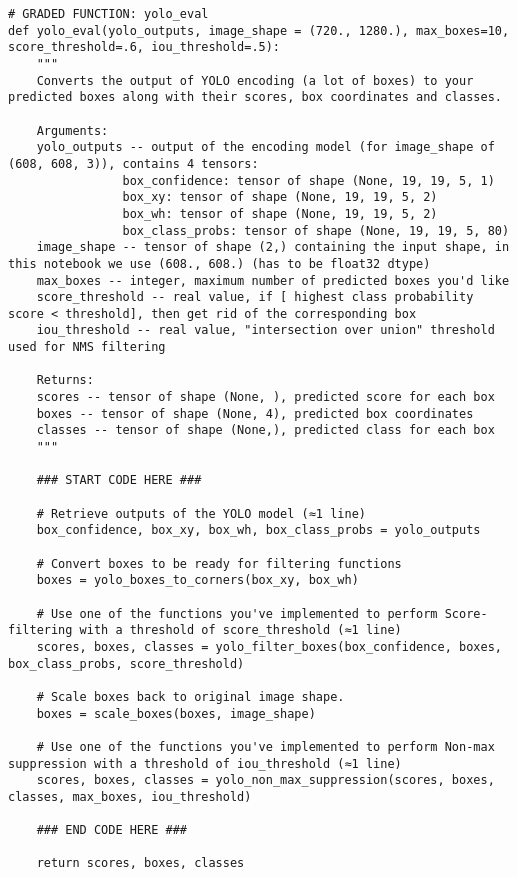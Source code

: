 \begin{verbatim}
# GRADED FUNCTION: yolo_eval
def yolo_eval(yolo_outputs, image_shape = (720., 1280.), max_boxes=10, score_threshold=.6, iou_threshold=.5):
    """
    Converts the output of YOLO encoding (a lot of boxes) to your predicted boxes along with their scores, box coordinates and classes.
    
    Arguments:
    yolo_outputs -- output of the encoding model (for image_shape of (608, 608, 3)), contains 4 tensors:
                box_confidence: tensor of shape (None, 19, 19, 5, 1)
                box_xy: tensor of shape (None, 19, 19, 5, 2)
                box_wh: tensor of shape (None, 19, 19, 5, 2)
                box_class_probs: tensor of shape (None, 19, 19, 5, 80)
    image_shape -- tensor of shape (2,) containing the input shape, in this notebook we use (608., 608.) (has to be float32 dtype)
    max_boxes -- integer, maximum number of predicted boxes you'd like
    score_threshold -- real value, if [ highest class probability score < threshold], then get rid of the corresponding box
    iou_threshold -- real value, "intersection over union" threshold used for NMS filtering
    
    Returns:
    scores -- tensor of shape (None, ), predicted score for each box
    boxes -- tensor of shape (None, 4), predicted box coordinates
    classes -- tensor of shape (None,), predicted class for each box
    """
    
    ### START CODE HERE ### 
    
    # Retrieve outputs of the YOLO model (≈1 line)
    box_confidence, box_xy, box_wh, box_class_probs = yolo_outputs

    # Convert boxes to be ready for filtering functions 
    boxes = yolo_boxes_to_corners(box_xy, box_wh)

    # Use one of the functions you've implemented to perform Score-filtering with a threshold of score_threshold (≈1 line)
    scores, boxes, classes = yolo_filter_boxes(box_confidence, boxes, box_class_probs, score_threshold)
    
    # Scale boxes back to original image shape.
    boxes = scale_boxes(boxes, image_shape)

    # Use one of the functions you've implemented to perform Non-max suppression with a threshold of iou_threshold (≈1 line)
    scores, boxes, classes = yolo_non_max_suppression(scores, boxes, classes, max_boxes, iou_threshold)
    
    ### END CODE HERE ###
    
    return scores, boxes, classes
\end{verbatim}


